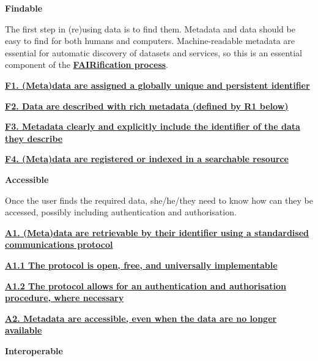 \documentclass[
  a4paper,
  openany, a4paper, oneside]{book}
\begin{document}
\textbf{{F}indable}

The first step in (re)using data is to find them. Metadata and data should be easy to find for both humans and computers. Machine-readable metadata are essential for automatic discovery of datasets and services, so this is an essential component of the \textbf{\href{https://www.go-fair.org/fair-principles/fairification-process/}{FAIRification process}}.

\textbf{\href{https://www.go-fair.org/fair-principles/fair-data-principles-explained/f1-meta-data-assigned-globally-unique-persistent-identifiers/}{F1. (Meta)data are assigned a globally unique and persistent identifier}}

\textbf{\href{https://www.go-fair.org/fair-principles/fair-data-principles-explained/f2-data-described-rich-metadata/}{F2. Data are described with rich metadata (defined by R1 below)}}

\textbf{\href{https://www.go-fair.org/fair-principles/f3-metadata-clearly-explicitly-include-identifier-data-describe/}{F3. Metadata clearly and explicitly include the identifier of the data they describe}}

\textbf{\href{https://www.go-fair.org/fair-principles/f4-metadata-registered-indexed-searchable-resource/}{F4. (Meta)data are registered or indexed in a searchable resource}}

\textbf{{A}ccessible}

Once the user finds the required data, she/he/they need to know how can they be accessed, possibly including authentication and authorisation.

\textbf{\href{https://www.go-fair.org/fair-principles/542-2/}{A1. (Meta)data are retrievable by their identifier using a standardised communications protocol}}

\textbf{\href{https://www.go-fair.org/fair-principles/a1-1-protocol-open-free-universally-implementable/}{A1.1 The protocol is open, free, and universally implementable}}

\textbf{\href{https://www.go-fair.org/fair-principles/a1-2-protocol-allows-authentication-authorisation-required/}{A1.2 The protocol allows for an authentication and authorisation procedure, where necessary}}

\textbf{\href{https://www.go-fair.org/fair-principles/a2-metadata-accessible-even-data-no-longer-available/}{A2. Metadata are accessible, even when the data are no longer available}}

\textbf{{I}nteroperable}
\end{document}
